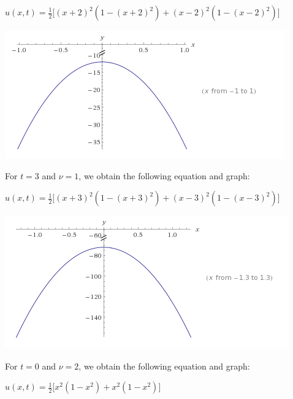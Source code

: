 \documentclass[executivepaper]{article}
\begin{document}
\begin{flushleft}
\vspace{3mm}

$u(x,t)=\frac{1}{2} \bigg[(x+2)^2(1-(x+2)^2)+(x-2)^2(1-(x-2)^2)\bigg]$

\vspace{3mm}

\includegraphics[scale=0.5]{TEqualToTwoAndVEqualToOne}

\vspace{3mm}

\pagebreak

\vspace*{-40mm}

For $t=3$ and $\nu=1$, we obtain the following equation and graph:

\vspace{3mm}

$u(x,t)=\frac{1}{2} \bigg[(x+3)^2(1-(x+3)^2)+(x-3)^2(1-(x-3)^2)\bigg]$

\vspace{3mm}

\includegraphics[scale=0.5]{TEqualToThreeAndVEqualTo1}

\vspace{3mm}

For $t=0$ and $\nu=2$, we obtain the following equation and graph:

\vspace{3mm}

$u(x,t)=\frac{1}{2} \bigg[x^2(1-x^2)+x^2(1-x^2)\bigg]$


\end{flushleft}
\end{document}
